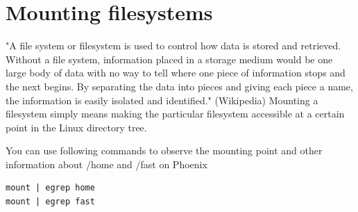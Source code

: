\section{Mounting filesystems}
\begin{information}
"A file system or filesystem is used to control how data is stored and retrieved. Without a file system, information placed in a storage medium would be one large body of data with no way to tell where one piece of information stops and the next begins. By separating the data into pieces and giving each piece a name, the information is easily isolated and identified." (Wikipedia)
Mounting a filesystem simply means making the particular filesystem accessible at a certain point in the Linux directory tree.
\end{information}

\begin{steps}
You can use following commands to observe the mounting point and other information about /home and /fast on Phoenix
\end{steps}
\begin{lstlisting}
mount | egrep home
mount | egrep fast
\end{lstlisting}



